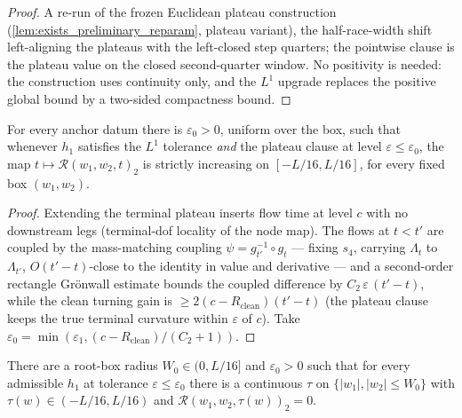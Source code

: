 \begin{proof}
  \leanok
  A re-run of the frozen Euclidean plateau construction
  (\cref{lem:exists_preliminary_reparam}, plateau variant), the
  half-race-width shift left-aligning the plateaus with the left-closed step
  quarters; the pointwise clause is the plateau value on the closed
  second-quarter window.  No positivity is needed: the construction uses
  continuity only, and the $L^1$ upgrade replaces the positive global bound
  by a two-sided compactness bound.
\end{proof}

\begin{lemma}
  \label{lem:turning_residual_strict_mono}
  For every anchor datum there is $\varepsilon_0>0$, uniform over the box,
  such that whenever $h_1$ satisfies the $L^1$ tolerance \emph{and} the
  plateau clause at level $\varepsilon\le\varepsilon_0$, the map
  $t\mapsto\mathcal R(w_1,w_2,t)_2$ is strictly increasing on
  $[-L/16,L/16]$, for every fixed box $(w_1,w_2)$.
\end{lemma}

\begin{proof}
  \leanok
  Extending the terminal plateau inserts flow time at level $c$ with no
  downstream legs (terminal-dof locality of the node map).  The flows at
  $t<t'$ are coupled by the mass-matching coupling
  $\psi=g_{t'}^{-1}\circ g_t$ — fixing $s_4$, carrying $\Lambda_t$ to
  $\Lambda_{t'}$, $O(t'-t)$-close to the identity in value and derivative —
  and a second-order rectangle Grönwall estimate bounds the coupled
  difference by $C_2\,\varepsilon\,(t'-t)$, while the clean turning gain is
  $\ge 2(c-R_{\mathrm{clean}})(t'-t)$ (the plateau clause keeps the true
  terminal curvature within $\varepsilon$ of $c$).  Take
  $\varepsilon_0=\min(\varepsilon_1,(c-R_{\mathrm{clean}})/(C_2+1))$.
\end{proof}

\begin{lemma}
  \label{lem:turning_root_continuous}
  There are a root-box radius $W_0\in(0,L/16]$ and $\varepsilon_0>0$ such
  that for every admissible $h_1$ at tolerance $\varepsilon\le\varepsilon_0$
  there is a continuous $\tau$ on $\{|w_1|,|w_2|\le W_0\}$ with
  $\tau(w)\in(-L/16,L/16)$ and $\mathcal R(w_1,w_2,\tau(w))_2=0$.
\end{lemma}

